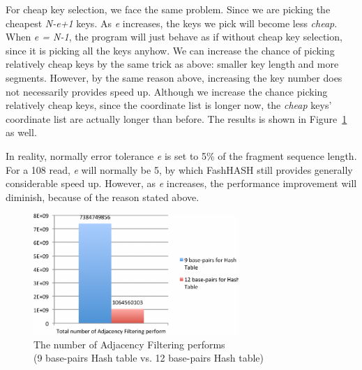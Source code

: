 For cheap key selection, we face the same problem. Since we are picking the
cheapest \textit{N-e+1} keys. As \textit{e} increases, the keys we pick will
become less \textit{cheap}. When \textit{e = N-1}, the program will just behave
as if without cheap key selection, since it is picking all the keys anyhow. We
can increase the chance of picking relatively cheap keys by the same trick as
above: smaller key length and more segments. However, by the same reason above,
increasing the key number does not necessarily provides speed up. Although we
increase the chance picking relatively cheap keys, since the coordinate list is
longer now, the \textit{cheap} keys’ coordinate list are actually longer than
before. The results is shown in Figure~\ref{fig:c0912_af} as well.

In reality, normally error tolerance \textit{e} is set to 5\% of the fragment
sequence length. For a 108 read, \textit{e} will normally be 5, by which
FashHASH still provides generally considerable speed up. However, as \textit{e}
increases, the performance improvement will diminish, because of the reason
stated above. \\

\begin{figure}[h] \centering
\vspace{0.1in}
\includegraphics[height=1.8in]{./figure/C0912_AF_B.pdf} \vspace{0in}
\caption{The number of Adjacency Filtering performs \\
		(9 base-pairs Hash table vs. 12 base-pairs Hash table)}
\label{fig:c0912_af} \end{figure}

